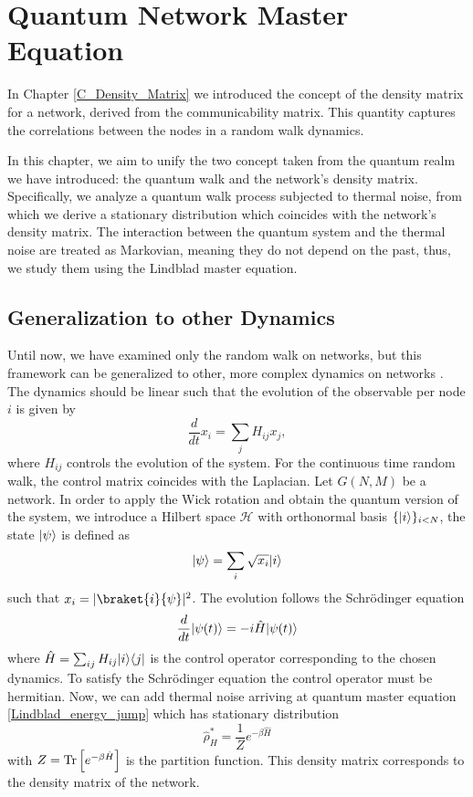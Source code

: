 \chapter{Quantum Network Master Equation}\label{C_Quantum_Network_Master_Equation}

In Chapter \ref{C_Density_Matrix} we introduced the concept of the density matrix for a network, derived from the communicability matrix. This quantity captures the correlations between the nodes in a random walk dynamics.

In this chapter, we aim to unify the two concept taken from the quantum realm we have introduced: the quantum walk and the network's density matrix.
Specifically, we analyze a quantum walk process subjected to thermal noise, from which we derive a stationary distribution which coincides with the network's density matrix. 
The interaction between the quantum system and the thermal noise are treated as Markovian, meaning they do not depend on the past, thus, we study them using the Lindblad master equation.






\section{Generalization to other Dynamics}

Until now, we have examined only the random walk on networks, but this framework can be generalized to other, more complex dynamics on networks \cite{De_Domenico_2023}.
The dynamics should be linear such that the evolution of the observable per node $i$ is given by 
\begin{equation}\label{general_dynamics}
    \frac{d}{dt} x_i = \sum_j H_{ij} x_j,
\end{equation}
where $H_{ij}$ controls the evolution of the system.
For the continuous time random walk, the control matrix coincides with the Laplacian.
Let $G(N,M)$ be a network. In order to apply the Wick rotation and obtain the quantum version of the system, we introduce a Hilbert space $\mathcal{H}$ with orthonormal basis $\{\lvert i\rangle\}_{i<N}$, the state $\lvert\psi\rangle$ is defined as
\begin{equation}
    \lvert\psi\rangle= \sum_i\sqrt{x_i}\lvert i\rangle
\end{equation}
such that $x_i = |\braket{i}{\psi}|^2$.
The evolution follows the Schrödinger equation
\begin{equation}
    \frac{d}{dt}\lvert\psi(t)\rangle = -i\hat H\lvert\psi(t)\rangle
\end{equation}
where 
$\hat H = \sum_{ij} H_{ij} \lvert i\rangle\langle j\rvert$ is the control operator corresponding to the chosen dynamics. To satisfy the Schrödinger equation the control operator must be hermitian.
Now, we can add thermal noise arriving at quantum master equation \eqref{Lindblad_energy_jump} which has stationary distribution 
\begin{equation}
    \hat\rho_H^*= \frac{1}{Z}e^{-\beta\hat H}
\end{equation}
with $Z= \operatorname{Tr}\left[e^{-\beta\hat H}\right]$ is the partition function. This density matrix corresponds to the density matrix of the network.

